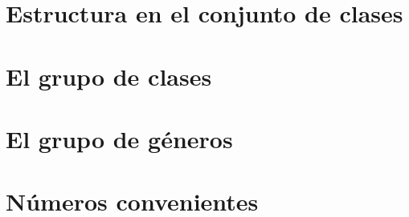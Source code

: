 \section{Estructura en el conjunto de clases}\label{sec:estructura}


\section{El grupo de clases}\label{sec:clases}


\section{El grupo de g\'eneros}\label{sec:generos}


\section{N\'umeros convenientes}\label{sec:convenientes}


